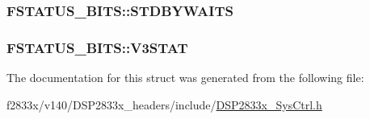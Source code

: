 \subsubsection[{S\+T\+D\+B\+Y\+W\+A\+I\+T\+S}]{ F\+S\+T\+A\+T\+U\+S\+\_\+\+B\+I\+T\+S\+::\+S\+T\+D\+B\+Y\+W\+A\+I\+T\+S}\label{struct_f_s_t_a_t_u_s___b_i_t_s_acb8fd0ba47941bb14991829c4338e301}
\hypertarget{struct_f_s_t_a_t_u_s___b_i_t_s_aa00cd6ec86807a3d218d670b06526007}{}
\subsubsection[{V3\+S\+T\+A\+T}]{ F\+S\+T\+A\+T\+U\+S\+\_\+\+B\+I\+T\+S\+::\+V3\+S\+T\+A\+T}\label{struct_f_s_t_a_t_u_s___b_i_t_s_aa00cd6ec86807a3d218d670b06526007}


The documentation for this struct was generated from the following file\+:\begin{DoxyCompactItemize}
\item 
f2833x/v140/\+D\+S\+P2833x\+\_\+headers/include/\hyperlink{_d_s_p2833x___sys_ctrl_8h}{D\+S\+P2833x\+\_\+\+Sys\+Ctrl.\+h}\end{DoxyCompactItemize}
